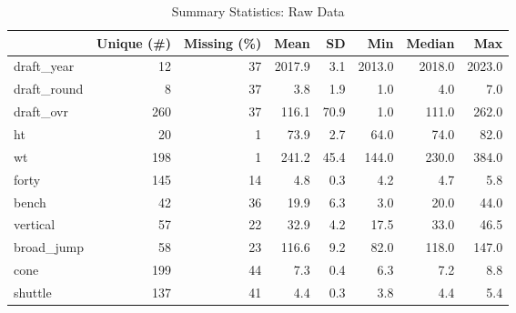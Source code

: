 \documentclass[12pt,english]{article}
\begin{document}
\begin{table}
\caption{Summary Statistics: Raw Data}
\centering
\begin{tabular}[t]{lrrrrrrr}
\toprule
  & Unique (\#) & Missing (\%) & Mean & SD & Min & Median & Max\\
\midrule
draft\_year & 12 & 37 & \num{2017.9} & \num{3.1} & \num{2013.0} & \num{2018.0} & \num{2023.0}\\
draft\_round & 8 & 37 & \num{3.8} & \num{1.9} & \num{1.0} & \num{4.0} & \num{7.0}\\
draft\_ovr & 260 & 37 & \num{116.1} & \num{70.9} & \num{1.0} & \num{111.0} & \num{262.0}\\
ht & 20 & 1 & \num{73.9} & \num{2.7} & \num{64.0} & \num{74.0} & \num{82.0}\\
wt & 198 & 1 & \num{241.2} & \num{45.4} & \num{144.0} & \num{230.0} & \num{384.0}\\
forty & 145 & 14 & \num{4.8} & \num{0.3} & \num{4.2} & \num{4.7} & \num{5.8}\\
bench & 42 & 36 & \num{19.9} & \num{6.3} & \num{3.0} & \num{20.0} & \num{44.0}\\
vertical & 57 & 22 & \num{32.9} & \num{4.2} & \num{17.5} & \num{33.0} & \num{46.5}\\
broad\_jump & 58 & 23 & \num{116.6} & \num{9.2} & \num{82.0} & \num{118.0} & \num{147.0}\\
cone & 199 & 44 & \num{7.3} & \num{0.4} & \num{6.3} & \num{7.2} & \num{8.8}\\
shuttle & 137 & 41 & \num{4.4} & \num{0.3} & \num{3.8} & \num{4.4} & \num{5.4}\\
\bottomrule
\end{tabular}
\end{table}
\end{document}

